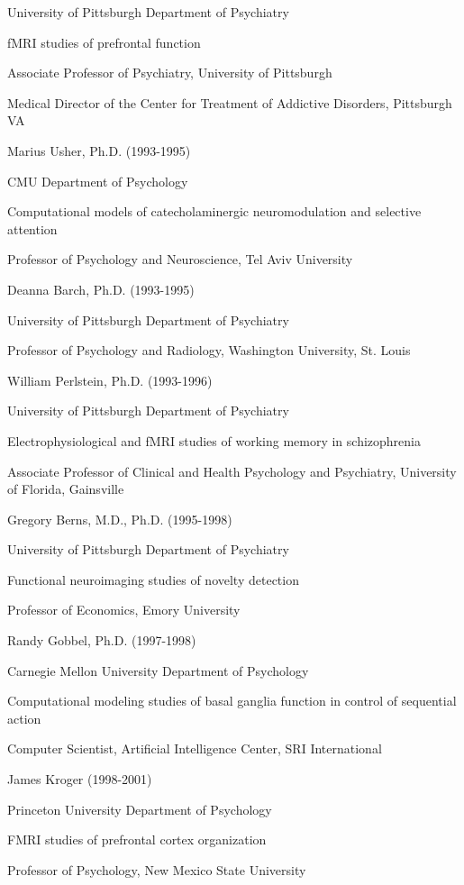\documentclass[10 pt]{article}
\begin{document}
University of Pittsburgh Department of Psychiatry

fMRI studies of prefrontal function

Associate Professor of Psychiatry, University of Pittsburgh

Medical Director of the Center for Treatment of Addictive Disorders, Pittsburgh VA
    \medskip

Marius Usher, Ph.D. (1993-1995)

CMU Department of Psychology

Computational models of catecholaminergic neuromodulation and selective attention

Professor of Psychology and Neuroscience, Tel Aviv University
    \medskip

Deanna Barch, Ph.D. (1993-1995)

University of Pittsburgh Department of Psychiatry

Professor of Psychology and Radiology, Washington University, St. Louis
    \medskip

William Perlstein, Ph.D. (1993-1996)

University of Pittsburgh Department of Psychiatry

Electrophysiological and fMRI studies of working memory in schizophrenia

Associate Professor of Clinical and Health Psychology and Psychiatry, University of Florida, Gainsville
    \medskip

Gregory Berns, M.D., Ph.D. (1995-1998)

University of Pittsburgh Department of Psychiatry

Functional neuroimaging studies of novelty detection

Professor of Economics, Emory University
    \medskip

Randy Gobbel, Ph.D. (1997-1998)

Carnegie Mellon University Department of Psychology

Computational modeling studies of basal ganglia function in control of sequential action

Computer Scientist, Artificial Intelligence Center, SRI International
    \medskip

James Kroger (1998-2001)

Princeton University Department of Psychology

FMRI studies of prefrontal cortex organization

Professor of Psychology, New Mexico State University
    \medskip
\end{document}

